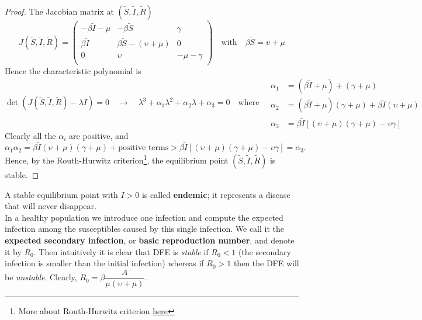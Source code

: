 \begin{proof}
	The Jacobian matrix at $(\tilde{S},\tilde{I},\tilde{R})$
	\begin{equation}
		J(\tilde{S},\tilde{I},\tilde{R})=
		\begin{pmatrix}
			-\beta\tilde{I}-\mu&-\beta\tilde{S}&\gamma\\
			\beta\tilde{I}&\beta\tilde{S}-(\upsilon+\mu)&0\\
			0&\upsilon&-\mu-\gamma\\
		\end{pmatrix}\quad\text{with}\quad \beta\tilde{S}=\upsilon+\mu
	\end{equation}
	Hence the characteristic polynomial is
	\begin{equation}
		\det(J(\tilde{S},\tilde{I},\tilde{R})-\lambda I)=0\quad\rightarrow\quad\lambda^3+\alpha_1\lambda^2+\alpha_2\lambda+\alpha_3=0\quad\text{where}\quad
		\begin{aligned}
			\alpha_1&=(\beta\tilde{I}+\mu)+(\gamma+\mu)\\
			\alpha_2&=(\beta\tilde{I}+\mu)(\gamma+\mu)+\beta\tilde{I}(\upsilon+\mu)\\
			\alpha_3&=\beta\tilde{I}[(\upsilon+\mu)(\gamma+\mu)-\upsilon\gamma]
		\end{aligned}
	\end{equation}
	Clearly all the $\alpha_i$ are positive, and
	\begin{equation}
		\alpha_1\alpha_2=\beta\tilde{I}(\upsilon+\mu)(\gamma+\mu)+\text{positive terms}>\beta\tilde{I}[(\upsilon+\mu)(\gamma+\mu)-\upsilon\gamma]=\alpha_3.
	\end{equation}
	Hence, by the Routh-Hurwitz criterion\footnote{More about Routh-Hurwitz criterion \href{https://en.wikipedia.org/wiki/Routh-Hurwitz_stability_criterion}{here}}, the equilibrium point $(\tilde{S},\tilde{I},\tilde{R})$ is stable.
\end{proof}
A stable equilibrium point with $I>0$ is called \textbf{endemic}; it represents a disease that will never disappear.\\
In a healthy population we introduce one infection and compute the expected infection among the susceptibles caused by this single infection.
We call it the \textbf{expected secondary infection}, or \textbf{basic reproduction number}, and denote it by $R_0$.
Then intuitively it is clear that DFE is \emph{stable} if $R_0<1$ (the secondary infection is smaller than the initial infection) whereas if $R_0>1$ then the DFE will be \emph{unstable}.
Clearly, $R_0=\beta\dfrac{A}{\mu(\upsilon+\mu)}$.
